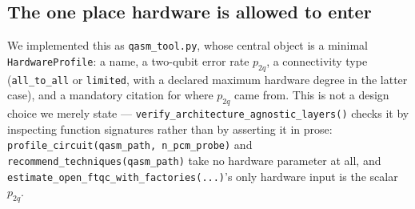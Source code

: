 \documentclass[9pt,twocolumn]{extarticle}
\begin{document}
\subsection{The one place hardware is allowed to enter}
We implemented this as \texttt{qasm\_tool.py}, whose central object is a
minimal \texttt{HardwareProfile}: a name, a two-qubit error rate
$p_{2q}$, a connectivity type (\texttt{all\_to\_all} or \texttt{limited},
with a declared maximum hardware degree in the latter case), and a
mandatory citation for where $p_{2q}$ came from. This is not a design
choice we merely state --- \texttt{verify\_architecture\_agnostic\_layers()}
checks it by inspecting function signatures rather than by asserting it
in prose: \texttt{profile\_circuit(qasm\_path, n\_pcm\_probe)} and
\texttt{recommend\_techniques(qasm\_path)} take no hardware parameter at
all, and \texttt{estimate\_open\_ftqc\_with\_factories(...)}'s only
hardware input is the scalar $p_{2q}$.
\end{document}

